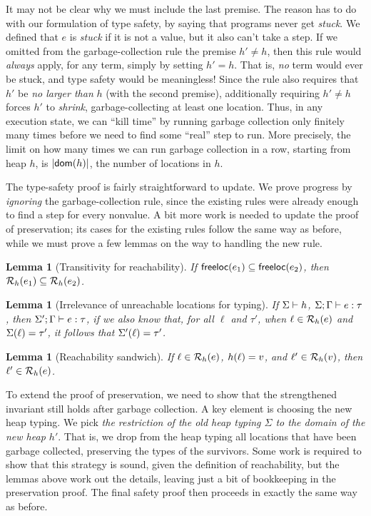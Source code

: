 \documentclass{amsbook}
\newtheorem{lemma}[theorem]{Lemma}
\theoremstyle{definition}
\theoremstyle{remark}
\numberwithin{section}{chapter}
\numberwithin{equation}{chapter}
\begin{document}
It may not be clear why we must include the last premise.
The reason has to do with our formulation of type safety, by saying that programs never get \emph{stuck}.
We defined that $e$ is \emph{stuck} if it is not a value, but it also can't take a step.
If we omitted from the garbage-collection rule the premise $h' \neq h$, then this rule would \emph{always} apply, for any term, simply by setting $h' = h$.
That is, \emph{no} term would ever be stuck, and type safety would be meaningless!
Since the rule also requires that $h'$ be \emph{no larger than} $h$ (with the second premise), additionally requiring $h' \neq h$ forces $h'$ to \emph{shrink}, garbage-collecting at least one location.
Thus, in any execution state, we can ``kill time'' by running garbage collection only finitely many times before we need to find some ``real'' step to run.
More precisely, the limit on how many times we can run garbage collection in a row, starting from heap $h$, is $|\mathsf{dom}(h)|$, the number of locations in $h$.

The type-safety proof is fairly straightforward to update.
We prove progress by \emph{ignoring} the garbage-collection rule, since the existing rules were already enough to find a step for every nonvalue.
A bit more work is needed to update the proof of preservation; its cases for the existing rules follow the same way as before, while we must prove a few lemmas on the way to handling the new rule.

\begin{lemma}[Transitivity for reachability]
  If $\mathsf{freeloc}(e_1) \subseteq \mathsf{freeloc}(e_2)$, then $\mathcal R_{h}(e_1) \subseteq \mathcal R_{h}(e_2)$.
\end{lemma}

\begin{lemma}[Irrelevance of unreachable locations for typing]
  If $\Sigma \vdash h$, $\Sigma; \Gamma \vdash e : \tau$, then $\Sigma'; \Gamma \vdash e : \tau$, if we also know that, for all $\ell$ and $\tau'$, when $\ell \in \mathcal R_{h}(e)$ and $\Sigma(\ell) = \tau'$, it follows that $\Sigma'(\ell) = \tau'$.
\end{lemma}

\begin{lemma}[Reachability sandwich]
  If $\ell \in \mathcal R_{h}(e)$, $h(\ell) = v$, and $\ell' \in \mathcal R_{h}(v)$, then $\ell' \in \mathcal R_{h}(e)$.
\end{lemma}

To extend the proof of preservation, we need to show that the strengthened invariant still holds after garbage collection.
A key element is choosing the new heap typing.
We pick \emph{the restriction of the old heap typing $\Sigma$ to the domain of the new heap $h'$}.
That is, we drop from the heap typing all locations that have been garbage collected, preserving the types of the survivors.
Some work is required to show that this strategy is sound, given the definition of reachability, but the lemmas above work out the details, leaving just a bit of bookkeeping in the preservation proof.
The final safety proof then proceeds in exactly the same way as before.
\end{document}
